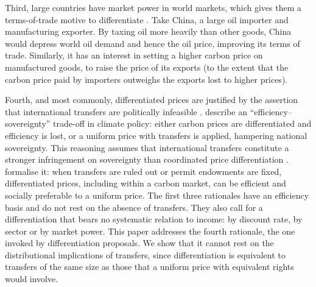 \documentclass[12pt,english]{article}
\theoremstyle{remark}
\begin{document}
Third, large countries have market power in world markets, which gives them a terms-of-trade motive to differentiate \citep{babiker_climate_2005,boeters_optimally_2014}. Take China, a large oil importer and manufacturing exporter. 
By taxing oil more heavily than other goods, China would depress world oil demand and hence the oil price, improving its terms of trade. Similarly, it has an interest in setting a higher carbon price on manufactured goods, to raise the price of its exports (to the extent that the carbon price paid by importers outweighs the exports lost to higher prices).

Fourth, and most commonly, differentiated prices are justified by the assertion that international transfers are politically infeasible \citep{parry_proposal_2021,young-brun_within-country_2025}. \citet{bauer_quantification_2020} describe an ``efficiency--sovereignty'' trade-off in climate policy: either carbon prices are differentiated and efficiency is lost, or a uniform price with transfers is applied, hampering national sovereignty. This reasoning assumes that international transfers constitute a stronger infringement on sovereignty than coordinated price differentiation \citep[see also][]{bekkers_comparing_2022}. \citet{fleurbaey_when_2025} formalise it: when transfers are ruled out or permit endowments are fixed, differentiated prices, including within a carbon market, can be efficient and socially preferable to a uniform price.
The first three rationales have an efficiency basis and do not rest on the absence of transfers. They also call for a differentiation that bears no systematic relation to income: by discount rate, by sector or by market power. This paper addresses the fourth rationale, the one invoked by differentiation proposals. We show that it cannot rest on the distributional implications of transfers, since differentiation is equivalent to transfers of the same size as those that a uniform price with equivalent rights would involve. %

\end{document}
